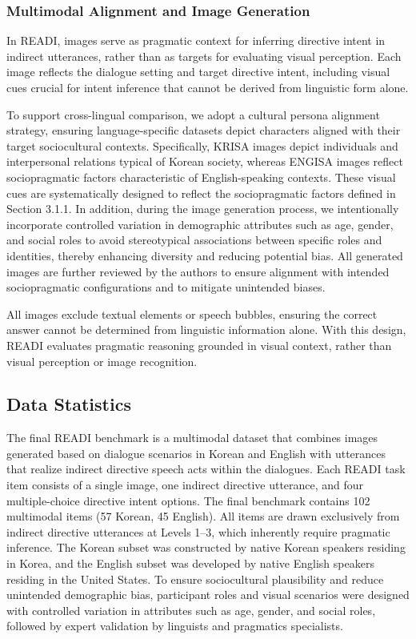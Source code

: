 \documentclass[11pt]{article}
\begin{document}
\subsubsection{Multimodal Alignment and Image Generation}

In READI, images serve as pragmatic context for inferring directive intent in indirect utterances, rather than as targets for evaluating visual perception. Each image reflects the dialogue setting and target directive intent, including visual cues crucial for intent inference that cannot be derived from linguistic form alone.

To support cross-lingual comparison, we adopt a cultural persona alignment strategy, ensuring language-specific datasets depict characters aligned with their target sociocultural contexts. Specifically, KRISA images depict individuals and interpersonal relations typical of Korean society, whereas ENGISA images reflect sociopragmatic factors characteristic of English-speaking contexts. These visual cues are systematically designed to reflect the sociopragmatic factors defined in Section 3.1.1. In addition, during the image generation process, we intentionally incorporate controlled variation in demographic attributes such as age, gender, and social roles to avoid stereotypical associations between specific roles and identities, thereby enhancing diversity and reducing potential bias. All generated images are further reviewed by the authors to ensure alignment with intended sociopragmatic configurations and to mitigate unintended biases.

All images exclude textual elements or speech bubbles, ensuring the correct answer cannot be determined from linguistic information alone. With this design, READI evaluates pragmatic reasoning grounded in visual context, rather than visual perception or image recognition.

\subsection{Data Statistics}

The final READI benchmark is a multimodal dataset that combines images generated based on dialogue scenarios in Korean and English with utterances that realize indirect directive speech acts within the dialogues. Each READI task item consists of a single image, one indirect directive utterance, and four multiple-choice directive intent options. The final benchmark contains 102 multimodal items (57 Korean, 45 English). All items are drawn exclusively from indirect directive utterances at Levels 1–3, which inherently require pragmatic inference. The Korean subset was constructed by native Korean speakers residing in Korea, and the English subset was developed by native English speakers residing in the United States. To ensure sociocultural plausibility and reduce unintended demographic bias, participant roles and visual scenarios were designed with controlled variation in attributes such as age, gender, and social roles, followed by expert validation by linguists and pragmatics specialists.
\end{document}
